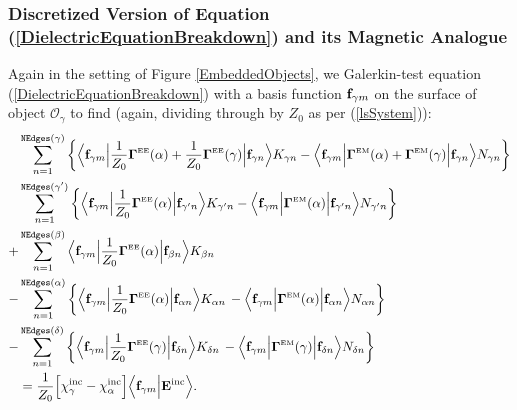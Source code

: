 \documentclass[dvips,letterpaper]{article}
\newcommand{\BG}{\boldsymbol{\Gamma}}
\begin{document}
\subsubsection*{Discretized Version of Equation
                (\ref{DielectricEquationBreakdown}) and its 
                Magnetic Analogue}

Again in the setting of Figure \ref{EmbeddedObjects}, we 
Galerkin-test equation (\ref{DielectricEquationBreakdown}) 
with a basis function $\mathbf{f}_{\gamma m}$ on the surface
of object $\mathcal{O}_\gamma$ to find (again, dividing through
by $Z_0$ as per (\ref{lsSystem})):
\begin{subequations}
\begin{align}
&\sum_{n=1}^{\texttt{NEdges}(\gamma)}  \bigg\{
   \Big\langle 
         \vb f_{\gamma m} 
   \Big| \frac{1}{Z_0} \BG\supt{EE}(\alpha) + \frac{1}{Z_0} \BG\supt{EE}(\gamma) \Big|
         \vb f_{\gamma n}
   \Big\rangle 
         K_{\gamma n}
   -
   \Big\langle 
         \vb f_{\gamma m} 
   \Big| \BG\supt{EM}(\alpha) + \BG\supt{EM}(\gamma) \Big|
         \vb f_{\gamma n}
   \Big\rangle 
         N_{\gamma n}
  \bigg\}
\nn
&\sum_{n=1}^{\texttt{NEdges}(\gamma^\prime)}  \bigg\{
   \Big\langle 
         \vb f_{\gamma m} 
   \Big| \frac{1}{Z_0}\BG\supt{EE}(\alpha) \Big|
         \vb f_{\gamma^\prime n}
   \Big\rangle 
         K_{\gamma^\prime n}
   -
   \Big\langle 
         \vb f_{\gamma m} 
   \Big| \BG\supt{EM}(\alpha) \Big|
         \vb f_{\gamma^\prime n}
   \Big\rangle 
         N_{\gamma^\prime n}
  \bigg\}
\nn
+&\sum_{n=1}^{\texttt{NEdges}(\beta)} 
   \Big\langle 
         \vb f_{\gamma m} 
   \Big| \frac{1}{Z_0} \BG\supt{EE}(\alpha) \Big| 
         \vb f_{\beta n}
   \Big\rangle 
         K_{\beta n}
\nn
-&\sum_{n=1}^{\texttt{NEdges}(\alpha)} \bigg\{
   \Big\langle 
         \vb f_{\gamma m} 
   \Big| \frac{1}{Z_0} \BG\supt{EE}(\alpha) \Big| 
         \vb f_{\alpha n}
   \Big\rangle 
         K_{\alpha n}
   \,-
   \Big\langle 
         \vb f_{\gamma m} 
   \Big| \BG\supt{EM}(\alpha) \Big| 
         \vb f_{\alpha n}
   \Big\rangle 
         N_{\alpha n}
  \bigg\}
\nn
-&\sum_{n=1}^{\texttt{NEdges}(\delta)} \bigg\{
   \Big\langle 
         \vb f_{\gamma m} 
   \Big| \frac{1}{Z_0} \BG\supt{EE}(\gamma) \Big| 
         \vb f_{\delta n}
   \Big\rangle 
         K_{\delta n}
   \,-
   \Big\langle 
         \vb f_{\gamma m} 
   \Big| \BG\supt{EM}(\gamma) \Big| 
         \vb f_{\delta n}
   \Big\rangle 
         N_{\delta n}
  \bigg\}
\nn
&=\frac{1}{Z_0} \Big[\chi_\gamma\sups{inc} - \chi_\alpha\sups{inc}\Big] 
   \Big\langle \vb f_{\gamma m} \Big| \vb E\sups{inc} \Big\rangle.
\end{align}


\end{subequations}
\end{document}
